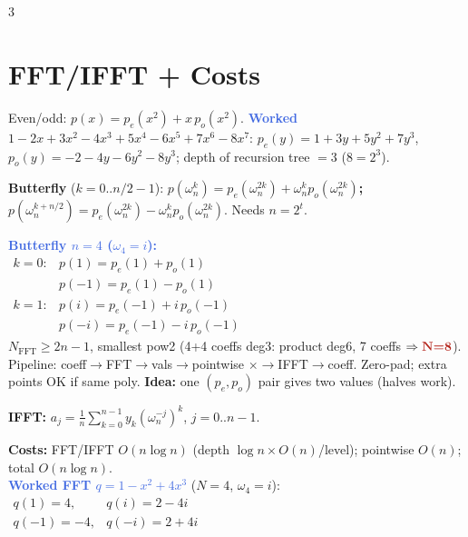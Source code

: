 \documentclass[9pt]{extarticle}
\newcommand{\hl}[1]{\textbf{\textcolor{BrickRed}{#1}}}
\newcommand{\wk}[1]{\textbf{\textcolor{OliveGreen}{#1}}}
\newcommand{\ex}[1]{\textbf{\textcolor{RoyalBlue}{#1}}}
\begin{document}
\begin{multicols}{3}
\section{FFT/IFFT + Costs}
\begin{sloppypar}\raggedright
Even/odd: $p(x){=}p_e(x^2){+}x\,p_o(x^2)$. \ex{Worked} $1{-}2x{+}3x^2{-}4x^3{+}5x^4{-}6x^5{+}7x^6{-}8x^7$: $p_e(y){=}1{+}3y{+}5y^2{+}7y^3$, $p_o(y){=}{-}2{-}4y{-}6y^2{-}8y^3$; depth of recursion tree ${=}3$ ($8{=}2^3$).
\end{sloppypar}
\begin{kbox}\raggedright
\textbf{Butterfly} ($k{=}0..n/2{-}1$): \hl{$p(\omega_n^k){=}p_e(\omega_n^{2k}){+}\omega_n^k p_o(\omega_n^{2k})$; $p(\omega_n^{k+n/2}){=}p_e(\omega_n^{2k}){-}\omega_n^k p_o(\omega_n^{2k})$}. Needs $n{=}2^t$.
\end{kbox}
\begin{sloppypar}\raggedright
\ex{Butterfly $n{=}4$ ($\omega_4{=}i$):}\\
$\begin{array}{ll}
k{=}0: & p(1){=}p_e(1){+}p_o(1)\\
& p({-}1){=}p_e(1){-}p_o(1)\\
k{=}1: & p(i){=}p_e({-}1){+}i\,p_o({-}1)\\
& p({-}i){=}p_e({-}1){-}i\,p_o({-}1)
\end{array}$\\
\hl{$N_{\mathrm{FFT}}\ge2n{-}1$}, smallest pow2 (4+4 coeffs deg3: product deg6, 7 coeffs $\Rightarrow \hl{N{=}8}$). Pipeline: coeff$\to$FFT$\to$vals$\to$pointwise ${\times}\to$IFFT$\to$coeff. Zero-pad; extra points OK if same poly. \wk{Idea:} one $(p_e,p_o)$ pair gives two values (halves work).\\
\end{sloppypar}
\begin{kbox}\raggedright
\textbf{IFFT:} $a_j{=}\frac{1}{n}\sum_{k=0}^{n-1}y_k(\omega_n^{-j})^k$, $j{=}0..n{-}1$.
\end{kbox}
\begin{sloppypar}\raggedright
\hl{Costs:} FFT/IFFT $O(n\log n)$ (depth $\log n\times O(n)$/level); pointwise $O(n)$; total $O(n\log n)$.\\
\ex{Worked FFT $q{=}1{-}x^2{+}4x^3$} ($N{=}4$, $\omega_4{=}i$):\\
$\begin{array}{ll}
q(1){=}4, & q(i){=}2{-}4i\\
q({-}1){=}{-}4, & q({-}i){=}2{+}4i
\end{array}$\\

\end{sloppypar}
\end{multicols}
\end{document}
